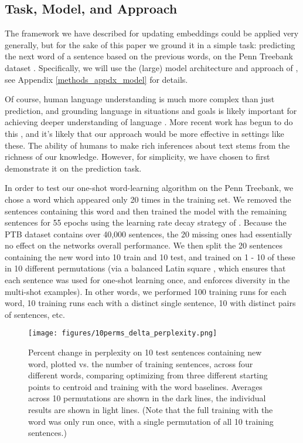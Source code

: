 \documentclass{article}
\begin{document}
\subsection{Task, Model, and Approach}
The framework we have described for updating embeddings could be applied very generally, but for the sake of this paper we ground it in a simple task: predicting the next word of a sentence based on the previous words, on the Penn Treebank dataset \citep{Marcus1993}. Specifically, we will use the (large) model architecture and approach of \citet{Zaremba2014a}, see Appendix \ref{methods_appdx_model} for details. \par
Of course, human language understanding is much more complex than just prediction, and grounding language in situations and goals is likely important for achieving deeper understanding of language \citep{Gauthier2016}. More recent work has begun to do this \citep[e.g]{Hermann2017}, and it's likely that our approach would be more effective in settings like these. The ability of humans to make rich inferences about text stems from the richness of our knowledge. However, for simplicity, we have chosen to first demonstrate it on the prediction task. \par 
In order to test our one-shot word-learning algorithm on the Penn Treebank, we chose a word which appeared only 20 times in the training set. We removed the sentences containing this word and then trained the model with the remaining sentences for 55 epochs using the learning rate decay strategy of \citet{Zaremba2014a}. Because the PTB dataset contains over 40,000 sentences, the 20 missing ones had essentially no effect on the networks overall performance. We then split the 20 sentences containing the new word into 10 train and 10 test, and trained on 1 - 10 of these in 10 different permutations (via a balanced Latin square \citep{Campbell1980}, which ensures that each sentence was used for one-shot learning once, and enforces diversity in the multi-shot examples). In other words, we performed 100 training runs for each word, 10 training runs each with a distinct single sentence, 10 with distinct pairs of sentences, etc.
\begin{figure}[t]
\centering
\texttt{[image: figures/10perms\_delta\_perplexity.png]}
\caption{Percent change in perplexity on 10 test sentences containing new word, plotted vs. the number of training sentences, across four different words, comparing optimizing from three different starting points to centroid and training with the word baselines. Averages across 10 permutations are shown in the dark lines, the individual results are shown in light lines. (Note that the full training with the word was only run once, with a single permutation of all 10 training sentences.)}
\label{main_results_1}
\end{figure}
\end{document}
